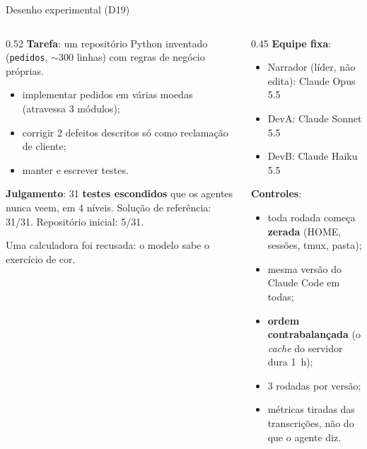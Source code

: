 \documentclass[11pt,aspectratio=169]{beamer}
\begin{document}
\begin{frame}{Desenho experimental (D19)}
\begin{columns}[T]
\begin{column}{0.52\linewidth}
\footnotesize
\textbf{Tarefa}: um repositório Python inventado (\texttt{pedidos}, $\sim$300 linhas) com regras de negócio próprias.
\begin{itemize}\setlength\itemsep{0.2em}
\item implementar pedidos em várias moedas (atravessa 3 módulos);
\item corrigir 2 defeitos descritos só como reclamação de cliente;
\item manter e escrever testes.
\end{itemize}
\textbf{Julgamento}: 31 \textbf{testes escondidos} que os agentes nunca veem, em 4 níveis. Solução de referência: 31/31.
Repositório inicial: 5/31.
\vspace{0.3em}

{\scriptsize\color{suave} Uma calculadora foi recusada: o modelo sabe o exercício de cor.}
\end{column}
\begin{column}{0.45\linewidth}
\footnotesize
\textbf{Equipe fixa}:
\begin{itemize}\setlength\itemsep{0.1em}
\item Narrador (líder, não edita): Claude Opus 5.5
\item DevA: Claude Sonnet 5.5
\item DevB: Claude Haiku 5.5
\end{itemize}
\textbf{Controles}:
\begin{itemize}\setlength\itemsep{0.1em}
\item toda rodada começa \textbf{zerada} (HOME, sessões, tmux, pasta);
\item mesma versão do Claude Code em todas;
\item \textbf{ordem contrabalançada} (o \emph{cache} do servidor dura 1~h);
\item 3 rodadas por versão;
\item métricas tiradas das transcrições, não do que o agente diz.
\end{itemize}
\end{column}
\end{columns}
\end{frame}
\end{document}
